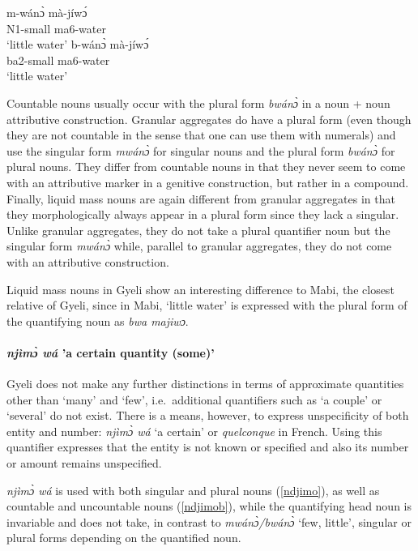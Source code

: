 \begin{exe}
\ex\label{littlewater}
\begin{xlist}
\ex \label{littlewater1}
  \gll     m-wánɔ̀ mà-jíwɔ́\\
                N1-small ma6-water \\
    \trans `little water'
\ex\label{littlewater2}
 \gll     *b-wánɔ̀ mà-jíwɔ́  \\
             ba2-small ma6-water  \\
    \trans `little water'
\end {xlist}
\end {exe}

\noindent Countable nouns usually occur with the plural form {\itshape bwánɔ̀} in a noun + noun attributive construction. Granular aggregates do have a plural form (even though they are not countable in the sense that one can use them with numerals) and use the singular form {\itshape mwánɔ̀} for singular nouns and the plural form {\itshape bwánɔ̀} for plural nouns. They differ from countable nouns in that they never seem to come with an attributive marker in a genitive construction, but rather in a compound. Finally, liquid mass nouns are again different from granular aggregates in that they morphologically always appear in a plural form since they lack a singular. Unlike granular aggregates, they do not take a plural quantifier noun but the singular form {\itshape mwánɔ̀} while, parallel to granular aggregates, they do not come with an attributive construction. 

Liquid mass nouns in Gyeli show an interesting difference to Mabi, the closest relative of Gyeli, since in Mabi, `little water' is expressed with the plural form of the quantifying noun as {\itshape bwa majiwɔ}.

\paragraph{{\itshape njìmɔ̀ wá} 'a certain quantity (some)'} 
Gyeli does not make any further distinctions in terms of approximate quantities other than `many' and `few', i.e.\ additional quantifiers such as `a couple' or `several' do not exist. There is a means, however, to express unspecificity of both entity and number: {\itshape njìmɔ̀ wá} `a certain' or {\itshape quelconque} in French. Using this quantifier expresses that the entity is not known or specified and also its number or amount remains unspecified. 

{\itshape njìmɔ̀ wá} is used with both singular and plural nouns (\ref{ndjimo}), as well as countable and uncountable nouns (\ref{ndjimob}), while the quantifying head noun is invariable and does not take, in contrast to {\itshape mwánɔ̀/bwánɔ̀} `few, little', singular or plural forms depending on the quantified noun.

